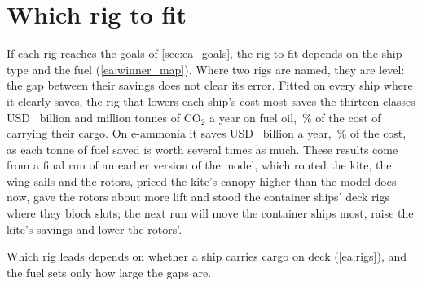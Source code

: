 \documentclass[10pt,a4paper]{article}
\begin{document}
\section{Which rig to fit}

If each rig reaches the goals of \cref{sec:ea_goals}, the rig to fit depends on the ship type and the fuel (\cref{ea:winner_map}). \NumAdvice{} Where two rigs are named, they are level: the gap between their savings does not clear its error. Fitted on every ship where it clearly saves, the rig that lowers each ship's cost most saves the thirteen classes USD~\NumFleetSavedOil{} billion and \NumFleetCarbonOil{} million tonnes of CO$_2$ a year on fuel oil, \NumFleetSavedShareOil\,\% of the cost of carrying their cargo. On e-ammonia it saves USD~\NumFleetSavedAmmonia{} billion a year, \NumFleetSavedShareAmmonia\,\% of the cost, as each tonne of fuel saved is worth several times as much.   These results come from a final run of an earlier version of the model, which routed the kite, the wing sails and the rotors, priced the kite's canopy higher than the model does now, gave the rotors about  more lift and stood the container ships' deck rigs where they block slots; the next run will move the container ships most, raise the kite's savings and lower the rotors'.

Which rig leads depends on whether a ship carries cargo on deck (\cref{ea:rigs}), and the fuel sets only how large the gaps are.
\end{document}
